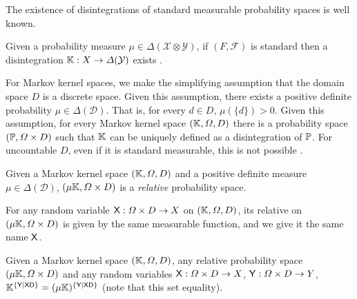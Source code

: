 The existence of disintegrations of standard measurable probability spaces is well known.

\begin{theorem}\label{th:disintegration_exist}
Given a probability measure $\mu\in \Delta(\mathcal{X}\otimes \mathcal{Y})$, if $(F,\mathcal{F})$ is standard then a disintegration $\mathbb{K}:X\to \Delta(\mathcal{Y})$ exists \citep{cinlar_probability_2011}.
\end{theorem}

For Markov kernel spaces, we make the simplifying assumption that the domain space $D$ is a discrete space. Given this assumption, there exists a positive definite probability $\mu\in \Delta(\mathcal{D})$. That is, for every $d\in D$, $\mu(\{d\})>0$. Given this assumption, for every Markov kernel space $(\mathbb{K},\Omega,D)$ there is a probability space $(\mathbb{P},\Omega\times D)$ such that $\mathbb{K}$ can be uniquely defined as a disintegration of $\mathbb{P}$. For uncountable $D$, even if it is standard measurable, this is not possible \citep{hajek_what_2003}.

\begin{definition}


Given a Markov kernel space $(\mathbb{K},\Omega,D)$ and a positive definite measure $\mu\in \Delta(\mathcal{D})$, $(\mu\mathbb{K},\Omega\times D)$ is a \emph{relative} probability space.

For any random variable $\mathsf{X}:\Omega\times D\to X$ on $(\mathbb{K},\Omega,D)$, its relative on $(\mu\mathbb{K},\Omega\times D)$ is given by the same measurable function, and we give it the same name $\mathsf{X}$.
\end{definition}


\begin{theorem}
Given a Markov kernel space $(\mathbb{K},\Omega,D)$, any relative probability space $(\mu\mathbb{K},\Omega\times D)$ and any random variables $\mathsf{X}:\Omega\times D\to X$, $\mathsf{Y}:\Omega\times D\to Y$, $\mathbb{K}^{\{\mathsf{Y}|\mathsf{X}\mathsf{D}\}}=(\mu\mathbb{K})^{\{\mathsf{Y}|\mathsf{X}\mathsf{D}\}}$ (note that this set equality).
\end{theorem}


